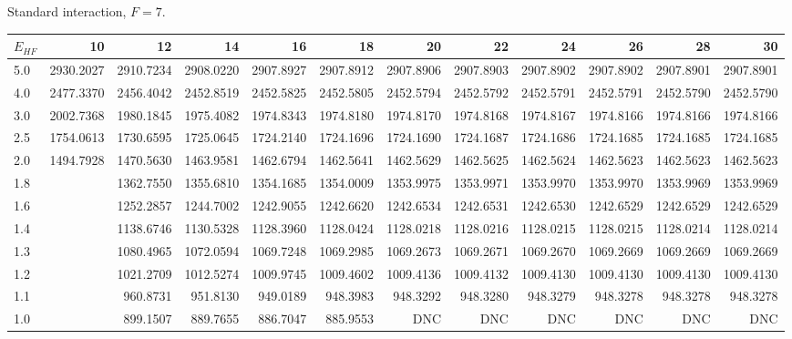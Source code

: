 \begin{landscape}
\begin{table}
\begin{small}
\begin{center}
Standard interaction, $F=7$.\\
\begin{tabular}{l|rrrrrrrrrrr}
\hline 
$E_{HF}$ & 10 & 12 & 14 & 16 & 18 & 20 & 22 & 24 & 26 & 28 & 30 \\
\hline \hline
5.0 & 2930.2027 & 2910.7234 & 2908.0220 & 2907.8927 & 2907.8912 & 2907.8906 & 2907.8903 & 2907.8902 & 2907.8902 & 2907.8901 & 2907.8901 \\ 
4.0 & 2477.3370 & 2456.4042 & 2452.8519 & 2452.5825 & 2452.5805 & 2452.5794 & 2452.5792 & 2452.5791 & 2452.5791 & 2452.5790 & 2452.5790 \\ 
3.0 & 2002.7368 & 1980.1845 & 1975.4082 & 1974.8343 & 1974.8180 & 1974.8170 & 1974.8168 & 1974.8167 & 1974.8166 & 1974.8166 & 1974.8166 \\ 
2.5 & 1754.0613 & 1730.6595 & 1725.0645 & 1724.2140 & 1724.1696 & 1724.1690 & 1724.1687 & 1724.1686 & 1724.1685 & 1724.1685 & 1724.1685 \\ 
2.0 & 1494.7928 & 1470.5630 & 1463.9581 & 1462.6794 & 1462.5641 & 1462.5629 & 1462.5625 & 1462.5624 & 1462.5623 & 1462.5623 & 1462.5623 \\ 
1.8 & 			& 1362.7550 & 1355.6810 & 1354.1685 & 1354.0009 & 1353.9975 & 1353.9971 & 1353.9970 & 1353.9970 & 1353.9969 & 1353.9969 \\ 
1.6 & 			& 1252.2857 & 1244.7002 & 1242.9055 & 1242.6620 & 1242.6534 & 1242.6531 & 1242.6530 & 1242.6529 & 1242.6529 & 1242.6529 \\ 
1.4 & 			& 1138.6746 & 1130.5328 & 1128.3960 & 1128.0424 & 1128.0218 & 1128.0216 & 1128.0215 & 1128.0215 & 1128.0214 & 1128.0214 \\ 
1.3 & 			& 1080.4965 & 1072.0594 & 1069.7248 & 1069.2985 & 1069.2673 & 1069.2671 & 1069.2670 & 1069.2669 & 1069.2669 & 1069.2669 \\ 
1.2 & 			& 1021.2709 & 1012.5274 & 1009.9745 & 1009.4602 & 1009.4136 & 1009.4132 & 1009.4130 & 1009.4130 & 1009.4130 & 1009.4130 \\ 
1.1 & 			&  960.8731 &  951.8130 &  949.0189 &  948.3983 &  948.3292 &  948.3280 &  948.3279 &  948.3278 &  948.3278 &  948.3278 \\ 
1.0 & 			&  899.1507 &  889.7655 &  886.7047 &  885.9553 &       DNC &      DNC  &    DNC    &       DNC &       DNC &       DNC \\ 

\end{tabular}
\end{center}
\end{small}
\end{table}
\end{landscape}
